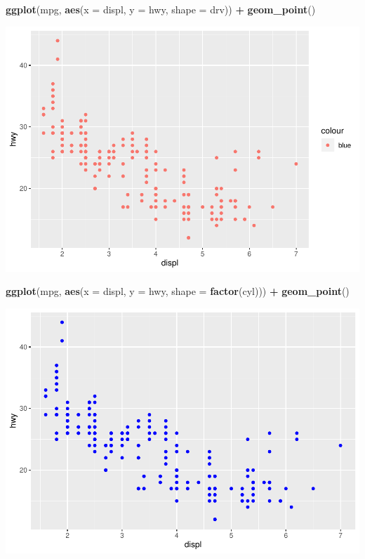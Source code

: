 \documentclass[
]{book}
\newenvironment{Shaded}{\begin{snugshade}}{\end{snugshade}}
\newcommand{\DataTypeTok}[1]{\textcolor[rgb]{0.13,0.29,0.53}{#1}}
\newcommand{\KeywordTok}[1]{\textcolor[rgb]{0.13,0.29,0.53}{\textbf{#1}}}
\newcommand{\NormalTok}[1]{#1}
\newcommand{\OperatorTok}[1]{\textcolor[rgb]{0.81,0.36,0.00}{\textbf{#1}}}
\newcommand{\StringTok}[1]{\textcolor[rgb]{0.31,0.60,0.02}{#1}}
\begin{document}
\begin{Shaded}
\begin{Highlighting}[]
\KeywordTok{ggplot}\NormalTok{(mpg, }\KeywordTok{aes}\NormalTok{(}\DataTypeTok{x =}\NormalTok{ displ,}
    \DataTypeTok{y =}\NormalTok{ hwy, }\DataTypeTok{shape =}\NormalTok{ drv)) }\OperatorTok{+}
\StringTok{    }\KeywordTok{geom_point}\NormalTok{()}
\end{Highlighting}
\end{Shaded}

\includegraphics{_main_files/figure-latex/unnamed-chunk-253-2.pdf}

\begin{Shaded}
\begin{Highlighting}[]
\KeywordTok{ggplot}\NormalTok{(mpg, }\KeywordTok{aes}\NormalTok{(}\DataTypeTok{x =}\NormalTok{ displ,}
    \DataTypeTok{y =}\NormalTok{ hwy, }\DataTypeTok{shape =} \KeywordTok{factor}\NormalTok{(cyl))) }\OperatorTok{+}
\StringTok{    }\KeywordTok{geom_point}\NormalTok{()}
\end{Highlighting}
\end{Shaded}

\includegraphics{_main_files/figure-latex/unnamed-chunk-253-3.pdf}
\end{document}
